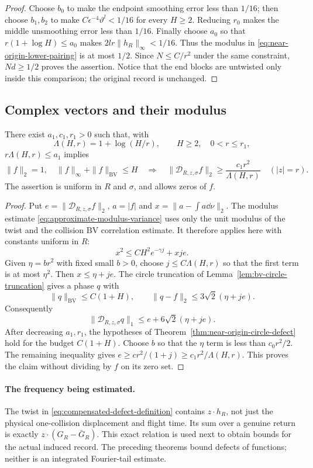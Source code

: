 \begin{proof}
Choose $b_0$ to make the endpoint smoothing error less than $1/16$;
then choose $b_1,b_2$ to make $C\epsilon^{-4}\vartheta^l<1/16$
for every $H\ge2$. Reducing $r_0$ makes the middle unsmoothing error
less than $1/16$. Finally choose $a_0$ so that
$r(1+\log H)\le a_0$ makes $2lr\|h_R\|_\infty<1/16$.
Thus the modulus in \eqref{eq:near-origin-lower-pairing} is at most
$1/2$. Since $N\le C/r^2$ under the same constraint, $Nd\ge1/2$
proves the assertion. Notice that the end blocks are untwisted only
inside this comparison; the original record is unchanged.
\end{proof}

\subsection{Complex vectors and their modulus}
\begin{theorem}
\label{thm:near-origin-vector-defect}
There exist $a_1,c_1,r_1>0$ such that, with
\[
 \Lambda(H,r)=1+\log(H/r),\qquad H\ge2,\quad 0<r\le r_1,
\]
$r\Lambda(H,r)\le a_1$ implies
\begin{equation}\label{eq:near-origin-vector-defect}
 \|f\|_2=1,\quad\|f\|_\infty+\|f\|_{\mathrm{BV}}\le H
 \quad\Longrightarrow\quad
 \|\mathcal D_{R,z,\sigma}f\|_2
                    \ge\frac{c_1r^2}{\Lambda(H,r)}
       \quad (|z|=r).
\end{equation}
The assertion is uniform in $R$ and $\sigma$, and allows zeros of $f$.
\end{theorem}
\begin{proof}
Put $e=\|\mathcal D_{R,z,\sigma}f\|_2$, $a=|f|$ and
$x=\|a-\int a\dd\nu\|_2$. The modulus estimate
\eqref{eq:approximate-modulus-variance} uses only the unit modulus of
the twist and the collision BV correlation estimate. It therefore
applies here with constants uniform in $R$:
\[
 x^2\le C H^2e^{-\gamma j}+xje.
\]
Given $\eta=b r^2$ with fixed small $b>0$, choose
$j\le C\Lambda(H,r)$ so that the first term is at most $\eta^2$.
Then $x\le\eta+je$. The circle truncation of
Lemma~\ref{lem:bv-circle-truncation} gives a phase $q$ with
\[
 \|q\|_{\mathrm{BV}}\le C(1+H),\qquad
 \|q-f\|_2\le3\sqrt2(\eta+je).
\]
Consequently
\[
 \|\mathcal D_{R,z,\sigma}q\|_1
       \le e+6\sqrt2(\eta+je).
\]
After decreasing $a_1,r_1$, the hypotheses of
Theorem~\ref{thm:near-origin-circle-defect} hold for the budget
$C(1+H)$. Choose $b$ so that the $\eta$ term is less than
$c_0r^2/2$. The remaining inequality gives
$e\ge c r^2/(1+j)\ge c_1r^2/\Lambda(H,r)$.
This proves the claim without dividing by $f$ on its zero set.
\end{proof}

\paragraph{The frequency being estimated.}
The twist in \eqref{eq:compensated-defect-definition} contains
$z\cdot h_R$, not just the physical one-collision displacement and
flight time. Its sum over a genuine return is exactly
$z\cdot(G_R-\bar G_R)$. This exact relation is used next to obtain
bounds for the actual induced record. The preceding theorems bound
defects of functions; neither is an integrated Fourier-tail estimate.
